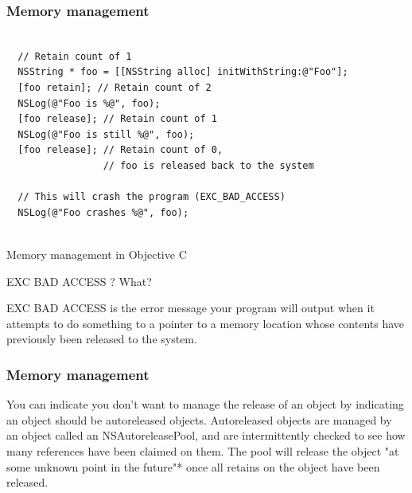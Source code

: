 \documentclass[10pt]{beamer}
\begin{document}
\begin{frame}[fragile]
  \frametitle{Memory management}
  \begin{listing}[H]
    \begin{verbatim}
  
  // Retain count of 1            
  NSString * foo = [[NSString alloc] initWithString:@"Foo"]; 
  [foo retain]; // Retain count of 2
  NSLog(@"Foo is %@", foo);
  [foo release]; // Retain count of 1
  NSLog(@"Foo is still %@", foo);
  [foo release]; // Retain count of 0,
                 // foo is released back to the system
                 
  // This will crash the program (EXC_BAD_ACCESS)
  NSLog(@"Foo crashes %@", foo); 
              
  \end{verbatim}
    \caption{Memory management in Objective C}
    \label{listing:9}
  \end{listing}
\begin{block}{EXC BAD ACCESS ? What?}
  
  EXC BAD ACCESS is the error message your program will output when
  it attempts to do something to a pointer to a memory location
  whose contents have previously been released to the system.
              
  \end{block}

\end{frame}

\begin{frame}[fragile]
  \frametitle{Memory management}
  You can indicate you don't want to manage the release of an object by indicating an object should be autoreleased objects.  Autoreleased objects are managed by an object called an NSAutoreleasePool, and are intermittently checked to see how many references have been claimed on them.  The pool will release the object "at some unknown point in the future"* once all  retains on the object have been released.

\end{frame}
\end{document}
